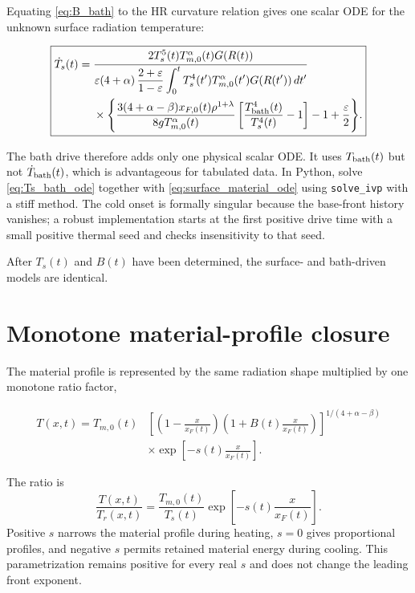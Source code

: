\documentclass[11pt]{article}
\numberwithin{equation}{section}
\newcommand{\Ts}{T_s}
\newcommand{\Tb}{T_{\rm bath}}
\newcommand{\Tr}{T_r}
\newcommand{\Tm}{T_{m,0}}
\newcommand{\xf}{x_F}
\newcommand{\xfzero}{x_{F,0}}
\newcommand{\eps}{\varepsilon}
\newcommand{\dif}{\,d}
\begin{document}
Equating \eqref{eq:B_bath} to the HR curvature relation gives one scalar ODE
for the unknown surface radiation temperature:
\begin{resultbox}
\begin{equation}
 \boxed{
 \begin{aligned}
 \dot\Ts(t)
 ={}&\frac{2\Ts^5(t)\Tm^\alpha(t)G(R(t))}
 {\eps(4+\alpha)\,\dfrac{2+\eps}{1-\eps}
 \displaystyle\int_0^t
 \Ts^4(t')\Tm^\alpha(t')G(R(t'))\dif t'}
 \\
 &\times\Bigg\{
 \frac{3(4+\alpha-\beta)\xfzero(t)\rho^{1+\lambda}}
 {8g\Tm^\alpha(t)}
 \left[\frac{\Tb^4(t)}{\Ts^4(t)}-1\right]
 -1+\frac{\eps}{2}\Bigg\}.
 \end{aligned}}
 \label{eq:Ts_bath_ode}
\end{equation}
\end{resultbox}
The bath drive therefore adds only one physical scalar ODE.  It uses $\Tb(t)$
but not $\dot\Tb(t)$, which is advantageous for tabulated data.  In Python,
solve \eqref{eq:Ts_bath_ode} together with
\eqref{eq:surface_material_ode} using \texttt{solve\_ivp} with a stiff method.
The cold onset is formally singular because the base-front history vanishes;
a robust implementation starts at the first positive drive time with a small
positive thermal seed and checks insensitivity to that seed.

After $\Ts(t)$ and $B(t)$ have been determined, the surface- and bath-driven
models are identical.

\section{Monotone material-profile closure}

The material profile is represented by the same radiation shape multiplied by
one monotone ratio factor,
\begin{resultbox}
\begin{equation}
 \boxed{
 \begin{aligned}
 T(x,t)=\Tm(t)
 &\left[
 \left(1-\frac{x}{\xf(t)}\right)
 \left(1+B(t)\frac{x}{\xf(t)}\right)
 \right]^{1/(4+\alpha-\beta)}
 \\
 &\times\exp\left[-s(t)\frac{x}{\xf(t)}\right].
 \end{aligned}}
 \label{eq:material_profile}
\end{equation}
\end{resultbox}
The ratio is
\begin{equation}
 \frac{T(x,t)}{\Tr(x,t)}
 =\frac{\Tm(t)}{\Ts(t)}
 \exp\left[-s(t)\frac{x}{\xf(t)}\right].
 \label{eq:temperature_ratio}
\end{equation}
Positive $s$ narrows the material profile during heating, $s=0$ gives
proportional profiles, and negative $s$ permits retained material energy during
cooling.  This parametrization remains positive for every real $s$ and does
not change the leading front exponent.
\end{document}
